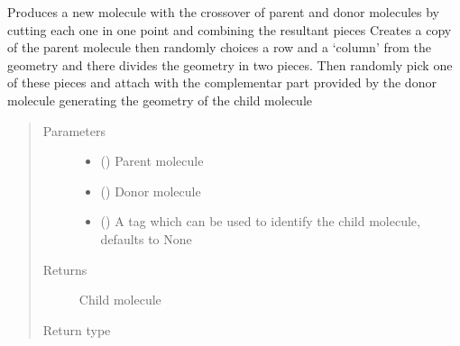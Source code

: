 \documentclass[letterpaper,10pt,english]{sphinxmanual}
\begin{document}
\begin{fulllineitems}
\label{\detokenize{molecular:molecular.crossover_1}}
\sphinxAtStartPar
Produces a new molecule with the crossover of parent and donor molecules by cutting each one in one point and
combining the resultant pieces
Creates a copy of the parent molecule then randomly choices a row and a ‘column’ from the geometry and there divides
the geometry in two pieces. Then randomly pick one of these pieces and attach with the complementar part provided by
the donor molecule generating the geometry of the child molecule
\begin{quote}\begin{description}
\item[{Parameters}] \leavevmode\begin{itemize}
\item {} 
\sphinxAtStartPar
{} ({\hyperref[\detokenize{molecular:molecular.Molecule}]{}}) \textendash{} Parent molecule

\item {} 
\sphinxAtStartPar
{} ({\hyperref[\detokenize{molecular:molecular.Molecule}]{}}) \textendash{} Donor molecule

\item {} 
\sphinxAtStartPar
{} (\sphinxstyleliteralemphasis{\sphinxupquote{, }}) \textendash{} A tag which can be used to identify the child molecule, defaults to None

\end{itemize}

\item[{Returns}] \leavevmode
\sphinxAtStartPar
Child molecule

\item[{Return type}] \leavevmode
\sphinxAtStartPar
{\hyperref[\detokenize{molecular:molecular.Molecule}]{}}

\end{description}\end{quote}

\end{fulllineitems}
\end{document}
